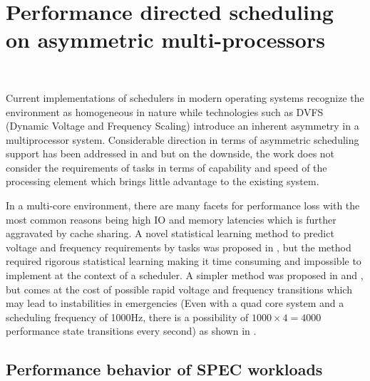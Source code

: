 \chapter{Performance directed scheduling on asymmetric multi-processors}~\label{chap:pds}

Current implementations of schedulers in modern operating systems recognize the environment
as homogeneous in nature while technologies such as DVFS (Dynamic Voltage and Frequency Scaling) introduce an
inherent asymmetry in a multiprocessor system. 
Considerable direction in terms of asymmetric scheduling support has been addressed in \cite{AsymmetricScheduling}
and \cite{Multitasking} but on the downside, the work does not consider the requirements of tasks in terms of capability
and speed of the processing element which brings little advantage to the existing system.

In a multi-core environment, there are many facets for performance loss with the most 
common reasons being high IO and memory latencies which is further aggravated by cache sharing.
A novel statistical learning method to predict voltage and frequency requirements by tasks 
was proposed in \cite{AnIntraTask}, but the method required rigorous statistical learning making it 
time consuming and impossible to implement at the context of a scheduler. A
simpler method was proposed in \cite{LiveRuntime} and \cite{Phaseaware}, but comes at the cost
of possible rapid voltage and frequency transitions which may lead to instabilities in emergencies
(Even with a quad core system and a scheduling frequency of 1000Hz, there is a possibility
of $1000 \times 4 = 4000$ performance state transitions every second) as shown in \cite{ImpactDVFS}. 

\section{Performance behavior of SPEC workloads}~\label{sec:perf_behav}

